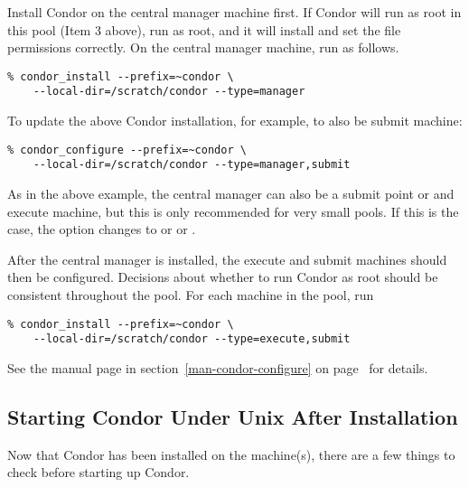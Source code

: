 Install Condor on the central manager machine first.  If Condor
will run as root in this pool (Item 3 above), run  
as root, and it will install and set the file permissions correctly.  
On the central manager machine, run  as follows.
\begin{verbatim}
% condor_install --prefix=~condor \
	--local-dir=/scratch/condor --type=manager
\end{verbatim}

To update the above Condor installation, for example, to also be
submit machine:
\begin{verbatim}
% condor_configure --prefix=~condor \
	--local-dir=/scratch/condor --type=manager,submit
\end{verbatim}

As in the above example, the central manager can also be a submit
point or and execute machine, but this is only recommended for very
small pools.  If this is the case, the  option changes to
 or   or 
.

After the central manager is installed, the execute and submit machines
should then be configured.  Decisions about whether to run Condor as root
should be consistent throughout the pool. For each machine in the pool,
run

\begin{verbatim}
% condor_install --prefix=~condor \
	--local-dir=/scratch/condor --type=execute,submit
\end{verbatim}

See the  manual page in
section~\ref{man-condor-configure} on
page~\pageref{man-condor-configure} for details.


\subsection{\label{installed-now-what}
Starting Condor Under Unix After Installation}

Now that Condor has been installed on the machine(s), there are a few
things to check before starting up Condor.

